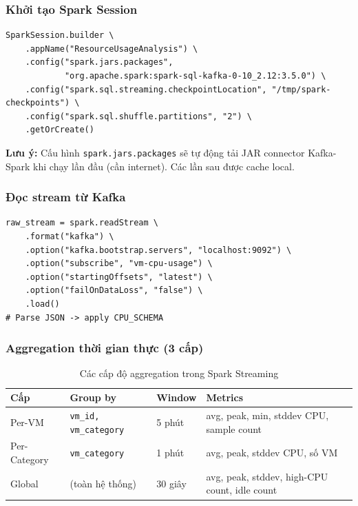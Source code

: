 \documentclass[12pt,a4paper]{article}
\begin{document}
\subsubsection{Khởi tạo Spark Session}
\begin{lstlisting}[style=python, caption={Tạo SparkSession với Kafka integration}]
SparkSession.builder \
    .appName("ResourceUsageAnalysis") \
    .config("spark.jars.packages",
            "org.apache.spark:spark-sql-kafka-0-10_2.12:3.5.0") \
    .config("spark.sql.streaming.checkpointLocation", "/tmp/spark-checkpoints") \
    .config("spark.sql.shuffle.partitions", "2") \
    .getOrCreate()
\end{lstlisting}

\begin{notebox}
\textbf{Lưu ý:} Cấu hình \texttt{spark.jars.packages} sẽ tự động tải JAR connector Kafka-Spark khi chạy lần đầu (cần internet). Các lần sau được cache local.
\end{notebox}

\subsubsection{Đọc stream từ Kafka}
\begin{lstlisting}[style=python, caption={Đọc streaming data từ Kafka}]
raw_stream = spark.readStream \
    .format("kafka") \
    .option("kafka.bootstrap.servers", "localhost:9092") \
    .option("subscribe", "vm-cpu-usage") \
    .option("startingOffsets", "latest") \
    .option("failOnDataLoss", "false") \
    .load()
# Parse JSON -> apply CPU_SCHEMA
\end{lstlisting}

\subsubsection{Aggregation thời gian thực (3 cấp)}

\begin{table}[H]
\centering
\begin{tabularx}{\linewidth}{l l l X}
\toprule
\textbf{Cấp} & \textbf{Group by} & \textbf{Window} & \textbf{Metrics} \\
\midrule
Per-VM & \texttt{vm\_id, vm\_category} & 5 phút & avg, peak, min, stddev CPU, sample count \\
Per-Category & \texttt{vm\_category} & 1 phút & avg, peak, stddev CPU, số VM \\
Global & (toàn hệ thống) & 30 giây & avg, peak, stddev, high-CPU count, idle count \\
\bottomrule
\end{tabularx}
\caption{Các cấp độ aggregation trong Spark Streaming}
\end{table}
\end{document}
